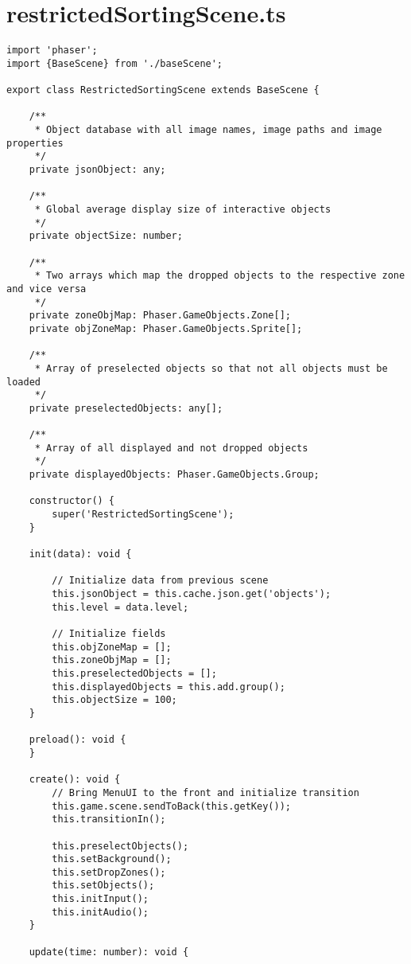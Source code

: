 \section{restrictedSortingScene.ts}\label{sec:restrictedsortingscene.ts}
\begin{lstlisting}[style=TypeScript, caption={restrictedSortingScene.ts}]
import 'phaser';
import {BaseScene} from './baseScene';

export class RestrictedSortingScene extends BaseScene {

    /**
     * Object database with all image names, image paths and image properties
     */
    private jsonObject: any;

    /**
     * Global average display size of interactive objects
     */
    private objectSize: number;

    /**
     * Two arrays which map the dropped objects to the respective zone and vice versa
     */
    private zoneObjMap: Phaser.GameObjects.Zone[];
    private objZoneMap: Phaser.GameObjects.Sprite[];

    /**
     * Array of preselected objects so that not all objects must be loaded
     */
    private preselectedObjects: any[];

    /**
     * Array of all displayed and not dropped objects
     */
    private displayedObjects: Phaser.GameObjects.Group;

    constructor() {
        super('RestrictedSortingScene');
    }

    init(data): void {

        // Initialize data from previous scene
        this.jsonObject = this.cache.json.get('objects');
        this.level = data.level;

        // Initialize fields
        this.objZoneMap = [];
        this.zoneObjMap = [];
        this.preselectedObjects = [];
        this.displayedObjects = this.add.group();
        this.objectSize = 100;
    }

    preload(): void {
    }

    create(): void {
        // Bring MenuUI to the front and initialize transition
        this.game.scene.sendToBack(this.getKey());
        this.transitionIn();

        this.preselectObjects();
        this.setBackground();
        this.setDropZones();
        this.setObjects();
        this.initInput();
        this.initAudio();
    }

    update(time: number): void {


\end{lstlisting}
